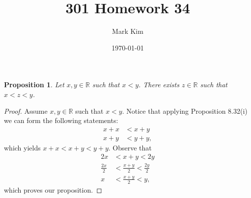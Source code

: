 \documentclass[12pt]{amsart}
\title{301 Homework 34}
\author{Mark Kim}
\date{\today}
\newcommand{\R}{\mathbb{R}}
\newtheorem*{proposition}{Proposition}
\begin{document}
\maketitle

\begin{proposition}
Let $x,y\in\R$ such that $x<y$. There exists $z\in\R$ such that $x<z<y$.
\end{proposition}

\begin{proof}
Assume $x,y\in\R$ such that $x<y$.  Notice that applying Proposition 8.32(i) we can form the following statements:
\begin{align*}
x+x &<x+y\\
x+y &<y+y,
\end{align*}
which yields $x+x<x+y<y+y$.  Observe that
\begin{align*}
2x &< x+y < 2y\\
\frac{2x}{2} &< \frac{x+y}{2} < \frac{2y}{2}\\
x &< \frac{x+y}{2} < y,
\end{align*}
which proves our proposition.
\end{proof}
\end{document}
